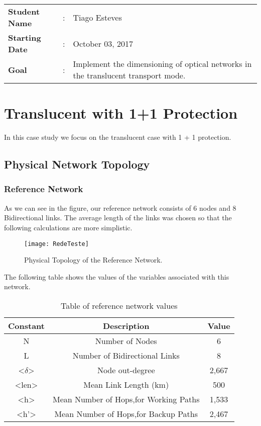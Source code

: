 \clearpage

\begin{tcolorbox}	
\begin{tabular}{p{2.75cm} p{0.2cm} p{10.5cm}} 	
\textbf{Student Name}  &:& Tiago Esteves\\
\textbf{Starting Date} &:& October 03, 2017\\
\textbf{Goal}          &:& Implement the dimensioning of optical networks in the translucent transport mode.
\end{tabular}
\end{tcolorbox}

\section{Translucent with 1+1 Protection}
In this case study we focus on the translucent case with 1 + 1 protection.


\subsection{Physical Network Topology}

\subsubsection{Reference Network}
As we can see in the figure, our reference network consists of 6 nodes and 8 Bidirectional links.
The average length of the links was chosen so that the following calculations are more simplistic.

\begin{figure}[h!]
\centering
\texttt{[image: RedeTeste]}
\caption{Physical Topology of the Reference Network.}
\end{figure}

The following table shows the values of the variables associated with this network.
\begin{table}[h!]
\centering
\begin{tabular}{|| c | c | c||}
 \hline
 Constant & Description & Value \\
 \hline\hline
 N & Number of Nodes & 6 \\
 L & Number of Bidirectional Links & 8 \\
 <$\delta$> & Node out-degree & 2,667 \\
 <len> & Mean Link Length (km) & 500 \\
 <h> & Mean Number of Hops,for Working Paths & 1,533 \\
 <h'> & Mean Number of Hops,for Backup Paths & 2,467 \\
 \hline
\end{tabular}
\caption{Table of reference network values}
\label{table:5}
\end{table}


